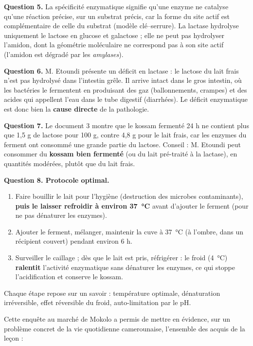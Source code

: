 \documentclass[11pt]{article}
\newcommand{\cle}[1]{{\popxbold\color{popdark}#1}}
\newcounter{popsec}
\newcounter{popsub}
\newcommand{\courssub}[1]{%
  \stepcounter{popsub}%
  \par\vspace{9pt}\noindent{\popxbold\fontsize{11.5}{13}\selectfont\color{popink}{\color{poporange}\thepopsec.\thepopsub}\hspace{6pt}#1}\par\nopagebreak\vspace{4pt}
}
\begin{document}
\begin{exoresolu}
\textbf{Question 5.} La \cle{spécificité enzymatique} signifie qu'une enzyme ne catalyse qu'une réaction précise, sur un substrat précis, car la forme du site actif est complémentaire de celle du substrat (modèle clé--serrure). La \cle{lactase} hydrolyse uniquement le \cle{lactose} en glucose et galactose ; elle ne peut pas hydrolyser l'amidon, dont la géométrie moléculaire ne correspond pas à son site actif (l'amidon est dégradé par les \emph{amylases}).

\textbf{Question 6.} M. Etoundi présente un \cle{déficit en lactase} : le lactose du lait frais n'est pas hydrolysé dans l'intestin grêle. Il arrive intact dans le gros intestin, où les bactéries le fermentent en produisant des gaz (ballonnements, crampes) et des acides qui appellent l'eau dans le tube digestif (diarrhées). Le déficit enzymatique est donc bien la \textbf{cause directe} de la pathologie.

\textbf{Question 7.} Le document 3 montre que le kossam fermenté 24 h ne contient plus que 1,5 g de lactose pour 100 g, contre 4,8 g pour le lait frais, car les enzymes du ferment ont consommé une grande partie du lactose. Conseil : M. Etoundi peut consommer du \textbf{kossam bien fermenté} (ou du lait pré-traité à la lactase), en quantités modérées, plutôt que du lait frais.

\textbf{Question 8. Protocole optimal.}
\begin{enumerate}
\item Faire bouillir le lait pour l'hygiène (destruction des microbes contaminants), \textbf{puis le laisser refroidir à environ \SI{37}{\celsius}} avant d'ajouter le ferment (pour ne pas dénaturer les enzymes).
\item Ajouter le ferment, mélanger, maintenir la cuve à \SI{37}{\celsius} (à l'ombre, dans un récipient couvert) pendant environ 6 h.
\item Surveiller le caillage ; dès que le lait est pris, réfrigérer : le froid (\SI{4}{\celsius}) \textbf{ralentit} l'activité enzymatique sans dénaturer les enzymes, ce qui stoppe l'acidification et conserve le kossam.
\end{enumerate}
Chaque étape repose sur un savoir : température optimale, dénaturation irréversible, effet réversible du froid, auto-limitation par le pH.
\end{exoresolu}

\courssub{Bilan de l'activité}

Cette enquête au marché de Mokolo a permis de mettre en évidence, sur un problème concret de la vie quotidienne camerounaise, l'ensemble des acquis de la leçon :
\end{document}
